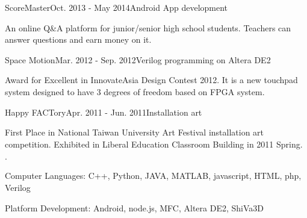 \documentclass{joel_cv}
\begin{document}
\begin{sectionContentNormal}{ScoreMaster}{Oct. 2013 - May 2014}{Android App development}
	\item An online Q\&A platform for junior/senior high school students. Teachers can answer questions and earn money on it.
\end{sectionContentNormal}

\begin{sectionContentNormal}{Space Motion}{Mar. 2012 - Sep. 2012}{Verilog programming on Altera DE2}
	\item Award for Excellent in InnovateAsia Design Contest 2012. It is a new touchpad system designed to have 3 degrees of freedom based on FPGA system.
\end{sectionContentNormal}

\begin{sectionContentNormal}{Happy FACTory}{Apr. 2011 - Jun. 2011}{Installation art}
	\item First Place in National Taiwan University Art Festival installation art competition. Exhibited in Liberal Education Classroom Building in 2011 Spring.
\end{sectionContentNormal}

%
%

\begin{sectionItemize}{$\cdot$}
	\item Computer Languages: C++, Python, JAVA, MATLAB, javascript, HTML, php, Verilog
	\item Platform Development: Android, node.js, MFC, Altera DE2, ShiVa3D
\end{sectionItemize}
\end{document}
